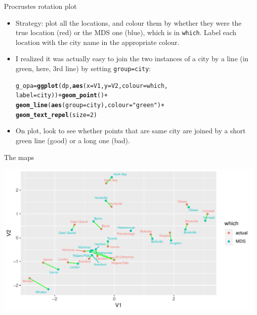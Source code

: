 \documentclass[unknownkeysallowed]{beamer}\usepackage[]{graphicx}\usepackage[]{color}
\makeatletter
\def\maxwidth{ %
  \ifdim\Gin@nat@width>\linewidth
    \linewidth
  \else
    \Gin@nat@width
  \fi
}
\newcommand{\hlnum}[1]{\textcolor[rgb]{0.686,0.059,0.569}{#1}}%
\newcommand{\hlstr}[1]{\textcolor[rgb]{0.192,0.494,0.8}{#1}}%
\newcommand{\hlopt}[1]{\textcolor[rgb]{0,0,0}{#1}}%
\newcommand{\hlstd}[1]{\textcolor[rgb]{0.345,0.345,0.345}{#1}}%
\newcommand{\hlkwb}[1]{\textcolor[rgb]{0.69,0.353,0.396}{#1}}%
\newcommand{\hlkwc}[1]{\textcolor[rgb]{0.333,0.667,0.333}{#1}}%
\newcommand{\hlkwd}[1]{\textcolor[rgb]{0.737,0.353,0.396}{\textbf{#1}}}%
\newenvironment{kframe}{%
 \def\at@end@of@kframe{}%
 \ifinner\ifhmode%
  \def\at@end@of@kframe{\end{minipage}}%
  \begin{minipage}{\columnwidth}%
 \fi\fi%
 \def\FrameCommand##1{\hskip\@totalleftmargin \hskip-\fboxsep
 \colorbox{shadecolor}{##1}\hskip-\fboxsep
     \hskip-\linewidth \hskip-\@totalleftmargin \hskip\columnwidth}%
 \MakeFramed {\advance\hsize-\width
   \@totalleftmargin\z@ \linewidth\hsize
   \@setminipage}}%
 {\par\unskip\endMakeFramed%
 \at@end@of@kframe}
\newenvironment{knitrout}{}{} %
\makeatother
\begin{document}
\begin{frame}[fragile]{Procrustes rotation plot}
  
  \begin{itemize}
  \item Strategy: plot all the locations, and colour them by whether
    they were the true location (red) or the MDS one (blue), which is
    in \texttt{which}. Label each location with the city name in the
    appropriate colour.
  \item I realized it
    was actually easy to join the two instances of a city by a line
    (in green, here, 3rd line) by setting \texttt{group=city}:
    
\begin{knitrout}\footnotesize
{}\color{fgcolor}\begin{kframe}
\begin{alltt}
\hlstd{g_opa} \hlkwb{=} \hlkwd{ggplot}\hlstd{(dp,}\hlkwd{aes}\hlstd{(}\hlkwc{x}\hlstd{=V1,}\hlkwc{y}\hlstd{=V2,}\hlkwc{colour}\hlstd{=which,}
                      \hlkwc{label}\hlstd{=city))}\hlopt{+}\hlkwd{geom_point}\hlstd{()}\hlopt{+}
    \hlkwd{geom_line}\hlstd{(}\hlkwd{aes}\hlstd{(}\hlkwc{group}\hlstd{=city),}\hlkwc{colour}\hlstd{=}\hlstr{"green"}\hlstd{)}\hlopt{+}
    \hlkwd{geom_text_repel}\hlstd{(}\hlkwc{size}\hlstd{=}\hlnum{2}\hlstd{)}
\end{alltt}
\end{kframe}
\end{knitrout}
\item On plot, look to see whether points that are same city are
  joined by a short green line (good) or a long one (bad).
  \end{itemize}
\end{frame}

\begin{frame}{The maps}
 
\begin{knitrout}
\color{fgcolor}
\includegraphics[width=\maxwidth]{figure/prosesto-1} 

\end{knitrout}
  
  
  
\end{frame}
\end{document}
